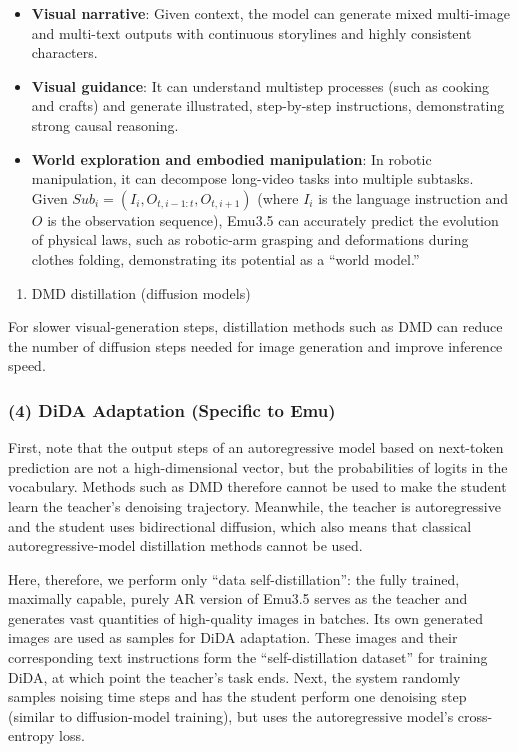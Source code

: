 \begin{itemize}
\tightlist
\item
  \textbf{Visual narrative}: Given context, the model can generate mixed multi-image and multi-text outputs with continuous storylines and highly consistent characters.
\item
  \textbf{Visual guidance}: It can understand multistep processes (such as cooking and crafts) and generate illustrated, step-by-step instructions, demonstrating strong causal reasoning.
\item
  \textbf{World exploration and embodied manipulation}: In robotic manipulation, it can decompose long-video tasks into multiple subtasks. Given \(Sub_i=(I_i,O_{t,i-1:t},O_{t,i+1})\) (where \(I_i\) is the language instruction and \(O\) is the observation sequence), Emu3.5 can accurately predict the evolution of physical laws, such as robotic-arm grasping and deformations during clothes folding, demonstrating its potential as a ``world model.''
\end{itemize}

\begin{enumerate}
\def\labelenumi{\arabic{enumi}.}
\setcounter{enumi}{2}
\tightlist
\item
  DMD distillation (diffusion models)
\end{enumerate}

For slower visual-generation steps, distillation methods such as DMD can reduce the number of diffusion steps needed for image generation and improve inference speed.

\hypertarget{dida-adaptation-specific-to-emu}{%
\subsubsection{(4) DiDA Adaptation (Specific to Emu)}\label{dida-adaptation-specific-to-emu}}

First, note that the output steps of an autoregressive model based on next-token prediction are not a high-dimensional vector, but the probabilities of logits in the vocabulary. Methods such as DMD therefore cannot be used to make the student learn the teacher's denoising trajectory. Meanwhile, the teacher is autoregressive and the student uses bidirectional diffusion, which also means that classical autoregressive-model distillation methods cannot be used.

Here, therefore, we perform only ``data self-distillation'': the fully trained, maximally capable, purely AR version of Emu3.5 serves as the teacher and generates vast quantities of high-quality images in batches. Its own generated images are used as samples for DiDA adaptation. These images and their corresponding text instructions form the ``self-distillation dataset'' for training DiDA, at which point the teacher's task ends. Next, the system randomly samples noising time steps and has the student perform one denoising step (similar to diffusion-model training), but uses the autoregressive model's cross-entropy loss.

